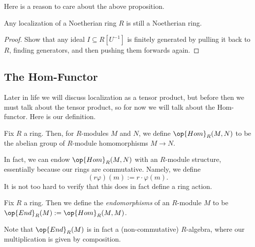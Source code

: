 Here is a reason to care about the above proposition.
\begin{corollary}
	Any localization of a Noetherian ring $R$ is still a Noetherian ring.
\end{corollary}
\begin{proof}
	Show that any ideal $I\subseteq R\left[U^{-1}\right]$ is finitely generated by pulling it back to $R$, finding generators, and then pushing them forwards again.
\end{proof}

\subsection{The \textrm{Hom}-Functor}
Later in life we will discuss localization as a tensor product, but before then we must talk about the tensor product, so for now we will talk about the \textrm{Hom}-functor. Here is our definition.
\begin{definition}
	Fix $R$ a ring. Then, for $R$-modules $M$ and $N$, we define $\op{Hom}_R(M,N)$ to be the abelian group of $R$-module homomorphisms $M\to N$.
\end{definition}
In fact, we can endow $\op{Hom}_R(M,N)$ with an $R$-module structure, essentially because our rings are commutative. Namely, we define
\[(r\varphi)(m):=r\cdot\varphi(m).\]
It is not too hard to verify that this does in fact define a ring action.
\begin{definition}
	Fix $R$ a ring. Then we define the \textit{endomorphisms} of an $R$-module $M$ to be $\op{End}_R(M):=\op{Hom}_R(M,M)$.
\end{definition}
Note that $\op{End}_R(M)$ is in fact a (non-commutative) $R$-algebra, where our multiplication is given by composition.

